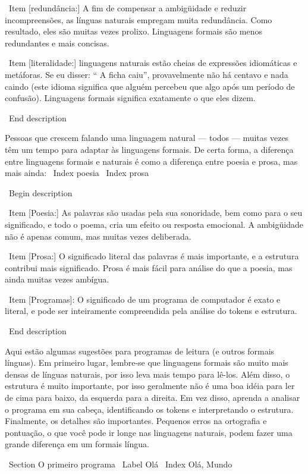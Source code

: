 \documentclass[10pt]{book}
\begin{document}
{\ Item [redundância:] A fim de compensar a ambigüidade e reduzir
incompreensões, as línguas naturais empregam muita
redundância. Como resultado, eles são muitas vezes prolixo. Linguagens formais
são menos redundantes e mais concisas.

\ Item [literalidade:] linguagens naturais estão cheias de expressões idiomáticas e metáforas.
Se eu disser: `` A ficha caiu'', provavelmente não há centavo e
nada caindo (este idioma significa que alguém percebeu que algo
após um período de confusão). Linguagens formais
significa exatamente o que eles dizem.

\ End {description}

Pessoas que crescem falando uma linguagem natural --- todos --- muitas vezes têm um
tempo para adaptar às linguagens formais. De certa forma, a diferença
entre linguagens formais e naturais é como a diferença entre
poesia e prosa, mas mais ainda:
\ Index {poesia}
\ Index {} prosa

\ Begin {description}

\ Item [Poesia:] As palavras são usadas pela sua sonoridade, bem como para
o seu significado, e todo o poema, cria um efeito ou
resposta emocional. A ambigüidade não é apenas comum, mas muitas vezes
deliberada.

\ Item [Prosa:] O significado literal das palavras é mais importante,
e a estrutura contribui mais significado. Prosa é mais fácil para
análise do que a poesia, mas ainda muitas vezes ambígua.

\ Item [Programas]: O significado de um programa de computador é exato
e literal, e pode ser inteiramente compreendida pela análise do
tokens e estrutura.

\ End {description}

Aqui estão algumas sugestões para programas de leitura (e outros formais
línguas). Em primeiro lugar, lembre-se que linguagens formais são muito mais densas
de línguas naturais, por isso leva mais tempo para lê-los. Além disso, o
estrutura é muito importante, por isso geralmente não é uma boa idéia para ler
de cima para baixo, da esquerda para a direita. Em vez disso, aprenda a analisar o
programa em sua cabeça, identificando os tokens e interpretando o
estrutura. Finalmente, os detalhes são importantes. Pequenos erros na
ortografia e pontuação, o que você pode ir longe
nas linguagens naturais, podem fazer uma grande diferença em um formais
língua.


\ Section {O primeiro programa}
\ Label {Olá}
\ Index {Olá, Mundo}

}
\end{document}
